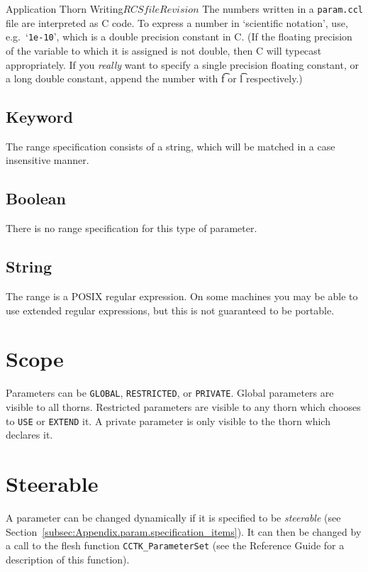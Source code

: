 \begin{cactuspart}{Application Thorn Writing}{$RCSfile$}{$Revision$}
The numbers written in a \texttt{param.ccl} file are interpreted as C code.
To express a number in `scientific notation', use,
e.g.\ `\texttt{1e-10}', which is a double precision constant in C.  (If the
floating precision of the variable to which it is assigned is not
double, then C will typecast appropriately.  If you \emph{really} want to
specify a single precision floating constant, or a long double
constant, append the number with {\t f} or {\t l} respectively.)

\subsection{Keyword}

The range specification consists of a string, which will be matched in
a case insensitive manner.

\subsection{Boolean}

There is no range specification for this type of parameter.

\subsection{String}

The range is a POSIX regular expression.  On some machines you may be
able to use extended regular expressions, but this is not guaranteed
to be portable.


\section{Scope}
\label{sec:Cactus_parameters.scope}

Parameters can be \texttt{GLOBAL}, \texttt{RESTRICTED}, or \texttt{PRIVATE}.
Global parameters are visible to all thorns.  Restricted parameters
are visible to any thorn which chooses to \texttt{USE} or \texttt{EXTEND}
it.  A private parameter is only visible to the thorn which declares
it.

\section{Steerable}
\label{sec:Cactus_parameters.steerable}
A parameter can be changed dynamically if it is specified to be
\textit{steerable} (see
Section~\ref{subsec:Appendix.param.specification_items}).
It can then be changed by a call to the flesh function
\texttt{CCTK\_ParameterSet} (see the Reference Guide for a description
of this function).


\end{cactuspart}
